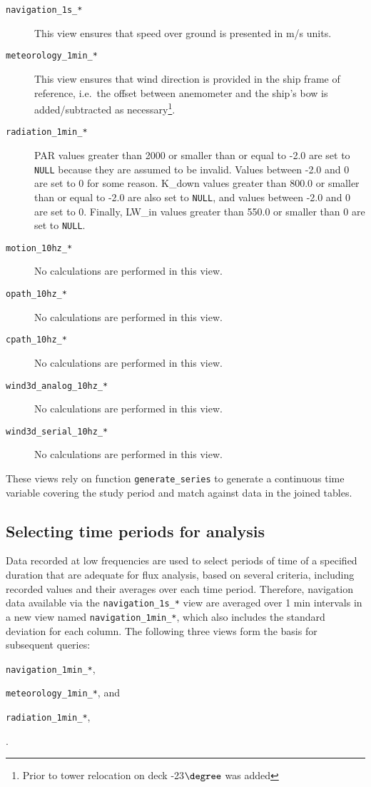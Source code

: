 \documentclass[12pt,letterpaper,titlepage,headings=small,numbers=noenddot]%
{scrartcl}
\begin{document}
\begin{description}
\item[\texttt{navigation\_1s\_*}] This view ensures that speed over ground
  is presented in m/s units.
\item[\texttt{meteorology\_1min\_*}] This view ensures that wind direction
  is provided in the ship frame of reference, i.e.~the offset between
  anemometer and the ship's bow is added/subtracted as
  necessary\footnote{Prior to tower relocation on deck -23$\degree$ was
    added}.
\item[\texttt{radiation\_1min\_*}] PAR values greater than 2000 or smaller
  than or equal to -2.0 are set to \texttt{NULL} because they are assumed
  to be invalid.  Values between -2.0 and 0 are set to 0 for some reason.
  K\_down values greater than 800.0 or smaller than or equal to -2.0 are
  also set to \texttt{NULL}, and values between -2.0 and 0 are set to 0.
  Finally, LW\_in values greater than 550.0 or smaller than 0 are set to
  \texttt{NULL}.
\item[\texttt{motion\_10hz\_*}] No calculations are performed in this view.
\item[\texttt{opath\_10hz\_*}] No calculations are performed in this view.
\item[\texttt{cpath\_10hz\_*}] No calculations are performed in this view.
\item[\texttt{wind3d\_analog\_10hz\_*}] No calculations are performed in
  this view.
\item[\texttt{wind3d\_serial\_10hz\_*}] No calculations are performed in
  this view.
\end{description}

These views rely on function \texttt{generate\_series} to generate a
continuous time variable covering the study period and match against data
in the joined tables.


\subsection{Selecting time periods for analysis}
\label{sec:select-periods}

Data recorded at low frequencies are used to select periods of time of a
specified duration that are adequate for flux analysis, based on several
criteria, including recorded values and their averages over each time
period.  Therefore, navigation data available via the
\texttt{navigation\_1s\_*} view are averaged over 1 min intervals in a new
view named \texttt{navigation\_1min\_*}, which also includes the standard
deviation for each column.  The following three views form the basis for
subsequent queries:
\begin{inparaenum}[a)]
\item \texttt{navigation\_1min\_*},
\item \texttt{meteorology\_1min\_*}, and
\item \texttt{radiation\_1min\_*},
\end{inparaenum}.
\end{document}
